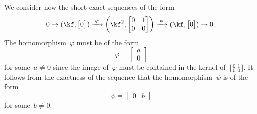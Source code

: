 \documentclass[a4paper, 11pt, twoside=semi]{scrartcl}
\begin{document}
We consider now the short exact sequences of the form
\begin{equation}
  \label{nonsplit ses}
  0
  \to
  (\kf, \begin{bmatrix} 0 \end{bmatrix})
  \xlongto{\varphi}
  \biggl( \kf^2, \begin{bmatrix} 0 & 1 \\ 0 & 0 \end{bmatrix} \biggr)
  \xlongto{\psi}
  (\kf, \begin{bmatrix} 0 \end{bmatrix})
  \to
  0 \,.
\end{equation}
The homomorphism~$\varphi$ must be of the form
\[
  \varphi
  =
  \begin{bmatrix}
    a \\
    0
  \end{bmatrix}
\]
for some~$a \neq 0$ since the image of~$\varphi$ must be contained in the kernel of~$\begin{bsmallmatrix} 0 & 1 \\ 0 & 0 \end{bsmallmatrix}$.
It follows from the exactness of the sequence that the homomorphism~$\psi$ is of the form
\[
  \psi
  =
  \begin{bmatrix}
    0 & b
  \end{bmatrix}
\]
for some~$b \neq 0$.
\end{document}
